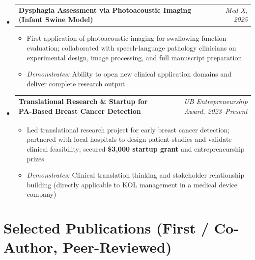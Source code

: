 \documentclass[letterpaper,10pt]{article}
\makeatletter
\newcommand{\projheading}[2]{
  \vspace{1pt}\item
  \begin{tabular*}{0.97\textwidth}[t]{l@{\extracolsep{\fill}}r}
    \textbf{#1} & \textit{\small#2} \\
  \end{tabular*}\vspace{2pt}
}
\newcommand{\projItemListStart}{\begin{itemize}[leftmargin=0.2in, topsep=3pt]}
\newcommand{\projItemListEnd}{\end{itemize}\vspace{2pt}}
\makeatother
\begin{document}
\begin{itemize}[leftmargin=0in, label={}]
  \projheading{Dysphagia Assessment via Photoacoustic Imaging (Infant Swine Model)}{Med-X, 2025}
  \projItemListStart
    \item First application of photoacoustic imaging for swallowing function evaluation; collaborated with speech-language pathology clinicians on experimental design, image processing, and full manuscript preparation
    \item \textit{Demonstrates:} Ability to open new clinical application domains and deliver complete research output
  \projItemListEnd

  \projheading{Translational Research \& Startup for PA-Based Breast Cancer Detection}{UB Entrepreneurship Award, 2023--Present}
  \projItemListStart
    \item Led translational research project for early breast cancer detection; partnered with local hospitals to design patient studies and validate clinical feasibility; secured \textbf{\$3,000 startup grant} and entrepreneurship prizes
    \item \textit{Demonstrates:} Clinical translation thinking and stakeholder relationship building (directly applicable to KOL management in a medical device company)
  \projItemListEnd

\end{itemize}

\vspace{-2pt}

\section{Selected Publications (First / Co-Author, Peer-Reviewed)}
\end{document}

